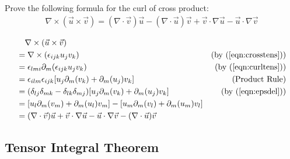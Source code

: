 \begin{exmp}
Prove the following formula for the curl of cross product:
\begin{align}
\nabla \times (\vec{u} \times \vec{v}) = (\nabla \cdot \vec{v})\vec{u} - (\nabla \cdot \vec{u})\vec{v}  + \vec{v} \cdot \nabla\vec{u} - \vec{u} \cdot \nabla\vec{v} 
\end{align}
\end{exmp}
\begin{solution}
\begin{align*}
&\quad \nabla \times (\vec{u} \times \vec{v}) \\
&= \nabla \times (\epsilon_{ijk}u_jv_k) &\text{(by (\ref{eqn:crosstens}))} \\
&= \epsilon_{lmi}\partial_m (\epsilon_{ijk}u_jv_k) &\text{(by (\ref{eqn:curltens}))} \\
&= \epsilon_{ilm}\epsilon_{ijk} [u_j\partial_m(v_k) + \partial_m(u_j)v_k] &\text{(Product Rule)} \\
&= (\delta_{lj}\delta_{mk} - \delta_{lk}\delta_{mj}) [u_j\partial_m(v_k) + \partial_m(u_j)v_k] &\text{(by (\ref{eqn:epsdel}))} \\
&= [u_l\partial_m(v_m) + \partial_m(u_l)v_m] - [u_m\partial_m(v_l) + \partial_m(u_m)v_l] \\
&= (\nabla \cdot \vec{v})\vec{u} + \vec{v} \cdot \nabla\vec{u} - \vec{u} \cdot \nabla\vec{v} - (\nabla \cdot \vec{u})\vec{v}
\end{align*}
\end{solution}

\subsection{Tensor Integral Theorem}

